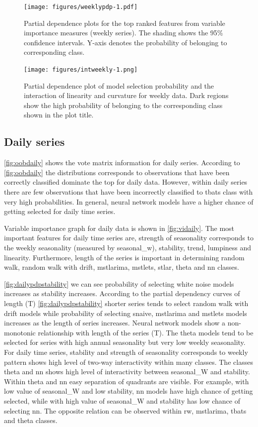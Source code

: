\documentclass[11pt,a4paper,]{article}
\begin{document}
\begin{figure}
\centering
\texttt{[image: figures/weeklypdp-1.pdf]}
\caption{\label{fig:weeklypdp}Partial dependence plots for the top ranked features from variable importance measures (weekly series). The shading shows the 95\% confidence intervals. Y-axis denotes the probability of belonging to corresponding class.}
\end{figure}

\begin{figure}
\centering
\texttt{[image: figures/intweekly-1.png]}
\caption{\label{fig:intweekly}Partial dependence plot of model selection probability and the interaction of linearity and curvature for weekly data. Dark regions show the high probability of belonging to the corresponding class shown in the plot title.}
\end{figure}

\hypertarget{daily-series}{%
\subsection{Daily series}\label{daily-series}}

\autoref{fig:oobdaily} shows the vote matrix information for daily series. According to \autoref{fig:oobdaily} the distributions corresponds to observations that have been correctly classified dominate the top for daily data. However, within daily series there are few observations that have been incorrectly classified to tbats class with very high probabilities. In general, neural network models have a higher chance of getting selected for daily time series.

Variable importance graph for daily data is shown in \autoref{fig:vidaily}. The most important features for daily time series are, strength of seasonality corresponds to the weekly seasonality (measured by seasonal\_w), stability, trend, lumpiness and linearity. Furthermore, length of the series is important in determining random walk, random walk with drift, mstlarima, mstlets, stlar, theta and nn classes.

\autoref{fig:dailypdpstability} we can see probability of selecting white noise models increases as stability increases. According to the partial dependency curves of length (T)
\autoref{fig:dailypdpstability} shorter series tends to select random walk with drift models while probability of selecting snaive, mstlarima and mstlets models increases as the length of series increases. Neural network models show a non-monotonic relationship with length of the series (T). The theta models tend to be selected for series with high annual seasonality but very low weekly seasonality. For daily time series, stability and strength of seasonality corresponds to weekly pattern shows high level of two-way interactivity within many classes. The classes theta and nn shows high level of interactivity between seasonal\_W and stability. Within theta and nn easy separation of quadrants are visible. For example, with low value of seasonal\_W and low stability, nn models have high chance of getting selected, while with high value of seasonal\_W and stability has low chance of selecting nn. The opposite relation can be observed within rw, mstlarima, tbats and theta classes.
\end{document}
